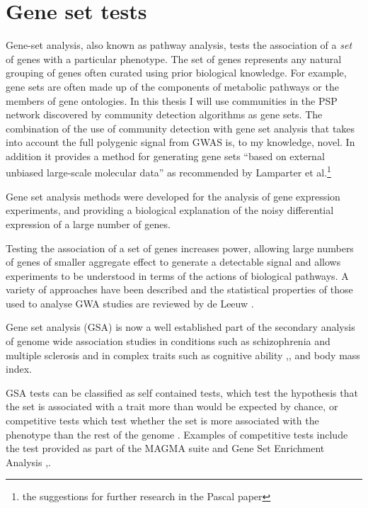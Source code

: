 \section{Gene set tests}
\label{sec:Gene set tests}
Gene-set analysis, also known as pathway analysis, tests the association of a \textit{set} of genes with a particular phenotype. The set of genes represents any natural grouping of genes often curated using prior biological knowledge. For example, gene sets are often made up of the components of metabolic pathways or the members of gene ontologies. In this thesis I will use communities in the PSP network discovered by community detection algorithms as gene sets. The combination of the use of community detection with gene set analysis that takes into account the full polygenic signal from GWAS is, to my knowledge, novel. In addition it provides a method for generating gene sets ``based on external unbiased large-scale molecular data'' as recommended by Lamparter et al.\footnote{the suggestions for further research in the Pascal paper} \cite{lamparter2016fast}

Gene set analysis methods were developed for the analysis of gene expression experiments\cite{tavazoie1999systematic},\cite{mootha2003pgc} and providing a biological explanation of the noisy differential expression of a large number of genes.

Testing the association of a set of genes increases power\cite{wang2011gene}, allowing large numbers of genes of smaller aggregate effect to generate a detectable signal and allows experiments to be understood in terms of the actions of biological pathways\cite{subramanian2005gene}. A variety of approaches have been described and the statistical properties of those used to analyse GWA studies are reviewed by de Leeuw \cite{de2016statistical}.

Gene set analysis (GSA) is now a well established part of the secondary analysis of genome wide association studies \cite{jia2011pathway} in conditions such as schizophrenia\cite{jia2010common} and multiple sclerosis \cite{baranzini2009pathway} and in complex traits such as cognitive ability \cite{hill2014human},\cite{sniekers2017genome},\cite{hill2019combined} and body mass index\cite{speliotes2010association}.

GSA tests can be classified as self contained tests, which test the hypothesis that the set is associated with a trait more than would be expected by chance, or competitive tests which test whether the set is more associated with the phenotype than the rest of the genome \cite{de2016statistical}. Examples of competitive tests include the test provided as part of the MAGMA suite\cite{de2015magma} and Gene Set Enrichment Analysis \cite{subramanian2005gene},\cite{maciejewski2014gene}.

